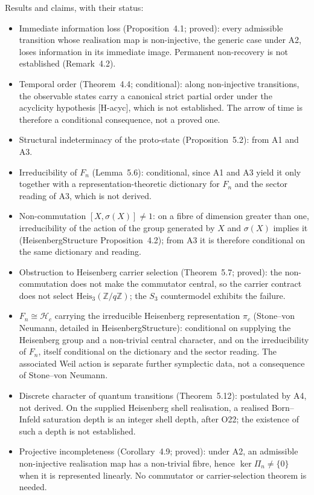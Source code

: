 \documentclass[11pt,a4paper]{article}
\theoremstyle{definition}
\newcommand{\Heis}{\mathrm{Heis}}
\newcommand{\Hc}{\mathcal{H}_c}
\newcommand{\pic}{\pi_c}
\begin{document}
      Results and claims, with their status:
      \begin{itemize}
        \item Immediate information loss (Proposition~4.1; proved): every admissible transition
        whose realisation map is non-injective, the generic case under A2, loses information in its
        immediate image.  Permanent non-recovery is not established (Remark~4.2).
        \item Temporal order (Theorem~4.4; conditional): along non-injective transitions, the
        observable states carry a canonical strict partial order under the acyclicity hypothesis
        [H-acyc], which is not established.  The arrow of time is therefore a conditional
        consequence, not a proved one.
        \item Structural indeterminacy of the proto-state (Proposition~5.2): from A1 and A3.
        \item Irreducibility of $F_n$ (Lemma~5.6): conditional, since A1 and A3 yield it only
        together with a representation-theoretic dictionary for $F_n$ and the sector reading of A3,
        which is not derived.
        \item Non-commutation $[X, \sigma(X)] \neq 1$: on a fibre of dimension greater than one,
        irreducibility of the action of the group generated by $X$ and $\sigma(X)$ implies it
        (HeisenbergStructure Proposition~4.2); from A3 it is therefore conditional on the same
        dictionary and reading.
        \item Obstruction to Heisenberg carrier selection (Theorem~5.7; proved): the
        non-commutation does not make the commutator central, so the carrier contract does
        not select $\Heis_3(\mathbb{Z}/q\mathbb{Z})$; the $S_3$ countermodel exhibits the failure.
        \item $F_n \cong \Hc$ carrying the irreducible Heisenberg representation $\pic$
        (Stone--von Neumann, detailed in HeisenbergStructure): conditional on supplying the
        Heisenberg group and a non-trivial central character, and on the irreducibility of $F_n$, itself
        conditional on the dictionary and the sector reading.  The associated Weil action is separate further
        symplectic data, not a consequence of Stone--von Neumann.
        \item Discrete character of quantum transitions (Theorem~5.12): postulated by A4, not derived.
        On the supplied Heisenberg shell realisation, a realised Born--Infeld saturation depth is an
        integer shell depth, after O22; the existence of such a depth is not established.
        \item Projective incompleteness (Corollary~4.9; proved): under A2, an admissible
        non-injective realisation map has a non-trivial fibre, hence $\ker \Pi_n \neq \{0\}$ when
        it is represented linearly.  No commutator or carrier-selection theorem is needed.
      \end{itemize}
\end{document}
